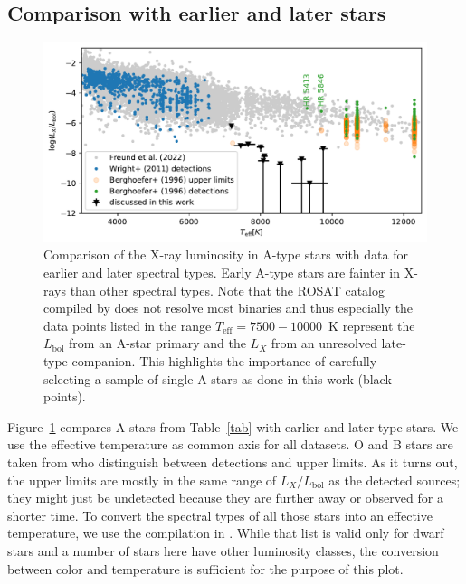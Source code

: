\documentclass[linenumbers]{aastex631}
\begin{document}
\subsection{Comparison with earlier and later stars}
\begin{figure}
    \centering
    \includegraphics[width=\textwidth]{lxlbol.pdf}
    \caption{Comparison of the X-ray luminosity in A-type stars with data for earlier and later spectral types. Early A-type stars are fainter in X-rays than other spectral types.
     Note that the ROSAT catalog compiled by \citet{Freund} does not resolve most binaries and thus especially the data points listed in the range $T_\mathrm{eff}=7500-10000$~K represent the $L_\mathrm{bol}$ from an A-star primary and the $L_X$ from an unresolved late-type companion. This highlights the importance of carefully selecting a sample of single A stars as done in this work (black points).} \label{fig:lxlbol}
\end{figure}

Figure~\ref{fig:lxlbol} compares A stars from Table~\ref{tab} with earlier and later-type stars. We use the effective temperature as common axis for all datasets. 
O and B stars are taken from \citet{1996A&AS..118..481B} who distinguish between detections and upper limits. As it turns out, the upper limits are mostly in the same range of $L_X/L_\mathrm{bol}$ as the detected sources; they might just be undetected because they are further away or observed for a shorter time. To convert the spectral types of all those stars into an effective temperature, we use the compilation in \citet{2013ApJS..208....9P}. While that list is valid only for dwarf stars and a number of stars here have other luminosity classes, the conversion between color and temperature is sufficient for the purpose of this plot.
\end{document}

